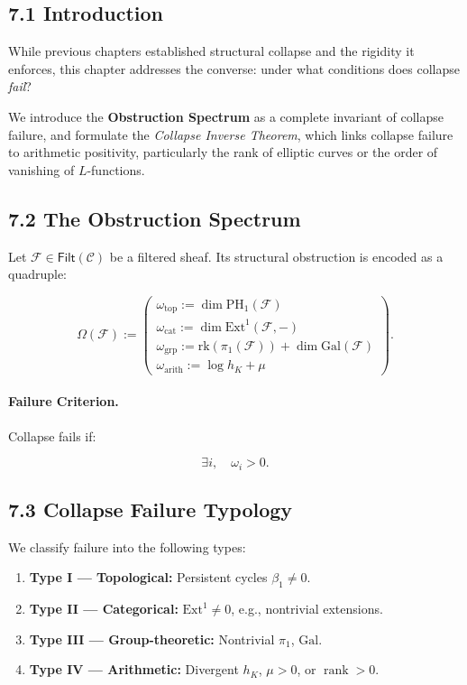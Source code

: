 \documentclass[11pt]{article}
\begin{document}
\subsection*{7.1 Introduction}

While previous chapters established structural collapse and the rigidity it enforces, this chapter addresses the converse: under what conditions does collapse \emph{fail}?

We introduce the \textbf{Obstruction Spectrum} as a complete invariant of collapse failure, and formulate the \textit{Collapse Inverse Theorem}, which links collapse failure to arithmetic positivity, particularly the rank of elliptic curves or the order of vanishing of \( L \)-functions.

\subsection*{7.2 The Obstruction Spectrum}

Let \( \mathcal{F} \in \mathsf{Filt}(\mathcal{C}) \) be a filtered sheaf. Its structural obstruction is encoded as a quadruple:

\[
\Omega(\mathcal{F}) := 
\begin{pmatrix}
\omega_{\mathrm{top}} := \dim \mathrm{PH}_1(\mathcal{F}) \\
\omega_{\mathrm{cat}} := \dim \mathrm{Ext}^1(\mathcal{F}, -) \\
\omega_{\mathrm{grp}} := \mathrm{rk}(\pi_1(\mathcal{F})) + \dim \mathrm{Gal}(\mathcal{F}) \\
\omega_{\mathrm{arith}} := \log h_K + \mu
\end{pmatrix}.
\]

\paragraph{Failure Criterion.}  
Collapse fails if:

\[
\exists i, \quad \omega_i > 0.
\]

\subsection*{7.3 Collapse Failure Typology}

We classify failure into the following types:

\begin{enumerate}
    \item \textbf{Type I — Topological:} Persistent cycles \( \beta_1 \neq 0 \).
    \item \textbf{Type II — Categorical:} \( \mathrm{Ext}^1 \neq 0 \), e.g., nontrivial extensions.
    \item \textbf{Type III — Group-theoretic:} Nontrivial \( \pi_1 \), \( \mathrm{Gal} \).
    \item \textbf{Type IV — Arithmetic:} Divergent \( h_K \), \( \mu > 0 \), or \( \operatorname{rank} > 0 \).
\end{enumerate}
\end{document}
